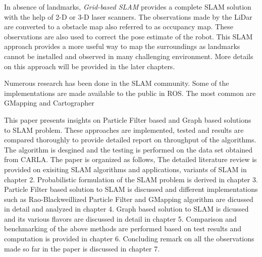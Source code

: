 In absence of landmarks, \textit{Grid-based SLAM} provides a complete SLAM solution with the help of 2-D or 3-D laser scanners. The observations made by the LiDar are 
converted to a obstacle map also referred to as occupancy map. These observations are also used to correct the pose estimate of the robot. This SLAM approach provides
a more useful way to map the surroundings as landmarks cannot be installed and observed in many challenging environment. More details on this approach will be provided in the 
later chapters.

Numerous research has been done in the SLAM community. Some of the implementations are made available to the public in ROS. The most common are GMapping and Cartographer

This paper presents insights on Particle Filter based and Graph based solutions to SLAM problem. These approaches are implemented, tested and results are compared thoroughly 
to provide detailed report on throughput of the algorithms. The algorithm is desgined and the testing is performed on the data set obtained from CARLA. The paper is organized 
as follows, The detailed literature review is provided on exisiting SLAM algorithms and applications, variants of SLAM in chapter 2. Probabilistic formulation of the SLAM
problem is derived in chapter 3. Particle Filter based solution to SLAM is discussed and different implementations such as Rao-Blackweillized Particle Filter and GMapping
algorithm are dicussed in detail and analyzed in chapter 4. Graph based solution to SLAM is dicussed and its various flavors are discussed in detail in chapter 5.
Comparison and benchmarking of the above methods are performed based on test results and computation is provided in chapter 6. Concluding remark on all the observations 
made so far in the paper is discussed in chapter 7.




